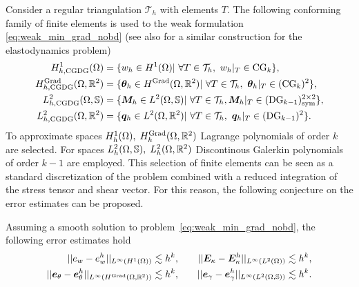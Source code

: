 Consider a regular triangulation $\mathcal{T}_h$ with elements $T$. The following conforming family of finite elements is used to the weak formulation \eqref{eq:weak_min_grad_nobd} (see also \cite{cohen2005} for a similar construction for the elastodynamics problem)
\begin{equation}\label{eq:CGDG}
\begin{aligned}
H_{h, \text{CGDG}}^{1}(\Omega) &= \{w_h \in H^1(\Omega) \vert \ \forall T \in \mathcal{T}_h, \ w_h|_{T} \in \mathrm{CG}_{k} \}, \\
H_{h, \text{CGDG}}^{\Grad}(\Omega, \bbR^2) &= \{ \bm{\theta}_h \in H^{\Grad}(\Omega, \bbR^2) \vert \ \forall T \in \mathcal{T}_h,\ \bm{\theta}_h|_{T} \in (\mathrm{CG}_{k})^2 \}, \\
L_{h, \text{CGDG}}^2(\Omega, \mathbb{S}) &= \{ \bm{M}_h \in L^2(\Omega, \mathbb{S}) \vert \ \forall T \in \mathcal{T}_h, \bm{M}_h|_{T} \in (\mathrm{DG}_{k-1})^{2 \times 2}_{\text{sym}} \}, \\
L_{h, \text{CGDG}}^2(\Omega, \bbR^2) &= \{\bm{q}_h \in L^2(\Omega, \bbR^2)  \vert \ \forall T \in \mathcal{T}_h,\ \bm{q}_h|_{T} \in (\mathrm{DG}_{k-1})^{2} \}. \\
\end{aligned}
\end{equation}
To approximate spaces $H_h^{1}(\Omega), \; H_h^{\operatorname*{Grad}}(\Omega, \mathbb{R}^2)$ Lagrange polynomials of order $k$ are selected. For spaces $L_h^2(\Omega, \mathbb{S}), \; L_h^2(\Omega, \mathbb{R}^2)$ Discontinous Galerkin polynomials of order $k-1$ are employed. This selection of finite elements can be seen as a standard discretization of the problem combined with a reduced integration of the stress tensor and shear vector. For this reason, the following conjecture on the error estimates can be proposed. 

\begin{conjecture}
	\label{conj:CGDGestimates}
	Assuming a smooth solution to problem~\eqref{eq:weak_min_grad_nobd}, the following error estimates hold 
	\begin{equation}
	\label{eq:errCGDG}
	\begin{aligned}
	||e_w - e_w^h||_{L^{\infty}(H^1(\Omega))} &\lesssim h^{k}, \\
	||\bm{e}_\theta - \bm{e}_\theta^h||_{L^{\infty}(H^{\operatorname*{Grad}}(\Omega, \mathbb{R}^2))} &\lesssim h^{k}, \\
	\end{aligned} \qquad
	\begin{aligned}
	||\bm{E}_\kappa - \bm{E}_\kappa^h||_{L^{\infty}(L^2(\Omega))} &\lesssim  h^{k}, \\
	||\bm{e}_\gamma - \bm{e}_\gamma^ h||_{L^{\infty}(L^2(\Omega, \mathbb{S}))} &\lesssim  h^{k}. \\
	\end{aligned} 
	\end{equation}
	
\end{conjecture}


